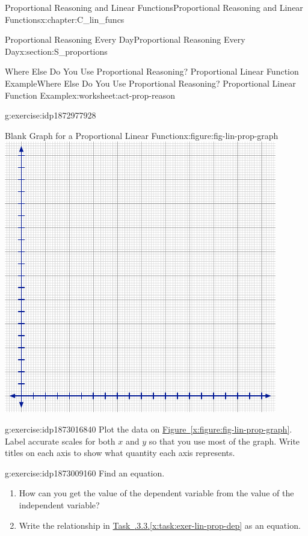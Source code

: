 \documentclass[oneside,10pt,]{book}
\newcommand{\xreffont}{\relax}
\numberwithin{equation}{chapter}
\begin{document}
\begin{chapterptx}{Proportional Reasoning and Linear Functions}{}{Proportional Reasoning and Linear Functions}{}{}{x:chapter:C_lin_funcs}
\begin{sectionptx}{Proportional Reasoning Every Day}{}{Proportional Reasoning Every Day}{}{}{x:section:S_proportions}
\begin{worksheet-subsection}{Where Else Do You Use Proportional Reasoning? Proportional Linear Function Example}{}{Where Else Do You Use Proportional Reasoning? Proportional Linear Function Example}{}{}{x:worksheet:act-prop-reason}
\begin{divisionexercise}{1}{}{}{g:exercise:idp1872977928}
\begin{sidebyside}{2}{0.025}{0.025}{0.05}
\begin{sbspanel}{0.7}
\begin{figureptx}{Blank Graph for a Proportional Linear Function}{x:figure:fig-lin-prop-graph}{}
\includegraphics[width=\linewidth]{external/blank-graph.pdf}
\tcblower
\end{figureptx}%
\end{sbspanel}%
\end{sidebyside}%
%
\end{divisionexercise}%
\begin{divisionexercise}{2}{}{}{g:exercise:idp1873016840}%
Plot the data on \hyperref[x:figure:fig-lin-prop-graph]{Figure~{\xreffont\ref{x:figure:fig-lin-prop-graph}}}. Label accurate scales for both \(x\) and \(y\) so that you use most of the graph. Write titles on each axis to show what quantity each axis represents.%
\end{divisionexercise}%
\begin{divisionexercise}{3}{}{}{g:exercise:idp1873009160}%
Find an equation.%
\begin{enumerate}[font=\bfseries,label=(\alph*),ref=\alph*]
\item\label{x:task:exer-lin-prop-dep}How can you get the value of the dependent variable from the value of the independent variable?%
\item{}Write the relationship in \hyperref[x:task:exer-lin-prop-dep]{Task~{\xreffont 2.5.3.3}.{\xreffont\ref{x:task:exer-lin-prop-dep}}} as an equation.%
\end{enumerate}

\end{divisionexercise}
\end{worksheet-subsection}
\end{sectionptx}
\end{chapterptx}
\end{document}
